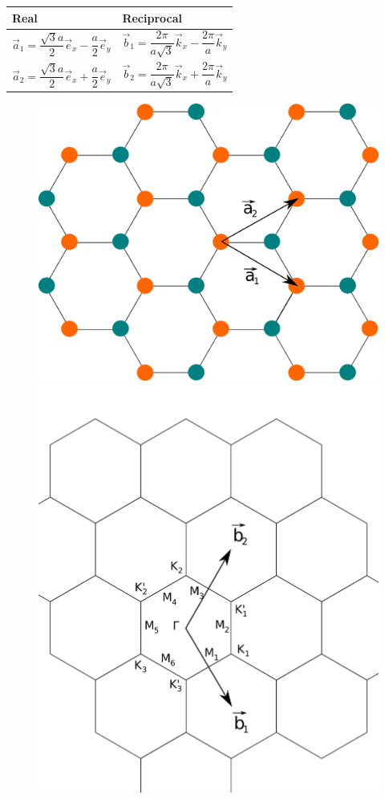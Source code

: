 \documentclass[a4paper,12pt]{report}
\begin{document}
\begin{tabular}{l|l}
\centering
Real & Reciprocal \\[0.1cm]\hline
$\vec{a}_1 = \dfrac{\sqrt{3}a}{2}\vec{e}_x - \dfrac{a}{2}\vec{e}_y$ &
$\vec{b}_1 = \dfrac{2\pi}{a\sqrt{3}}\vec{k}_x-\dfrac{2\pi}{a}\vec{k}_y $\\[0.2cm]
$\vec{a}_2 = \dfrac{\sqrt{3}a}{2}\vec{e}_x + \dfrac{a}{2}\vec{e}_y$ &
$\vec{b}_2 = \dfrac{2\pi}{a\sqrt{3}}\vec{k}_x + \dfrac{2\pi}{a}\vec{k}_y $\\[0.2cm]
\hline
\end{tabular}
\begin{figure}[h]
 \centering
 \includegraphics[scale=0.5,keepaspectratio=true]{figures/real_symmetric1.png}\hspace*{1.5cm}
 \includegraphics[scale=0.5,keepaspectratio=true]{figures/rec_symmetric1.png}

\end{figure}
\end{document}
